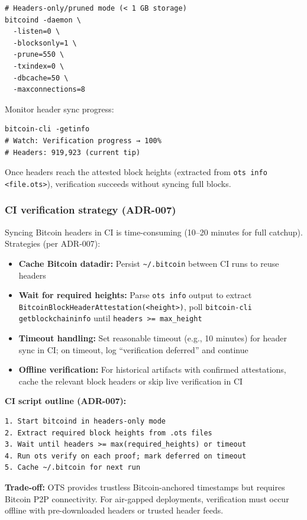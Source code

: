 \begin{verbatim}
# Headers-only/pruned mode (< 1 GB storage)
bitcoind -daemon \
  -listen=0 \
  -blocksonly=1 \
  -prune=550 \
  -txindex=0 \
  -dbcache=50 \
  -maxconnections=8
\end{verbatim}

Monitor header sync progress:
\begin{verbatim}
bitcoin-cli -getinfo
# Watch: Verification progress → 100%
# Headers: 919,923 (current tip)
\end{verbatim}

Once headers reach the attested block heights (extracted from \texttt{ots info <file.ots>}), verification succeeds without syncing full blocks.

\subsubsection{CI verification strategy (ADR-007)}
Syncing Bitcoin headers in CI is time-consuming (10--20 minutes for full catchup).
Strategies (per ADR-007):

\begin{itemize}[nosep]
  \item \textbf{Cache Bitcoin datadir:} Persist \texttt{\textasciitilde/.bitcoin} between CI runs to reuse headers
  \item \textbf{Wait for required heights:} Parse \texttt{ots info} output to extract \texttt{BitcoinBlockHeaderAttestation(<height>)}, poll \texttt{bitcoin-cli getblockchaininfo} until \texttt{headers >= max\_height}
  \item \textbf{Timeout handling:} Set reasonable timeout (e.g., 10 minutes) for header sync in CI; on timeout, log ``verification deferred'' and continue
  \item \textbf{Offline verification:} For historical artifacts with confirmed attestations, cache the relevant block headers or skip live verification in CI
\end{itemize}

\textbf{CI script outline (ADR-007):}
\begin{verbatim}
1. Start bitcoind in headers-only mode
2. Extract required block heights from .ots files
3. Wait until headers >= max(required_heights) or timeout
4. Run ots verify on each proof; mark deferred on timeout
5. Cache ~/.bitcoin for next run
\end{verbatim}

\textbf{Trade-off:} OTS provides trustless Bitcoin-anchored timestamps but requires Bitcoin P2P connectivity.
For air-gapped deployments, verification must occur offline with pre-downloaded headers or trusted header feeds.


